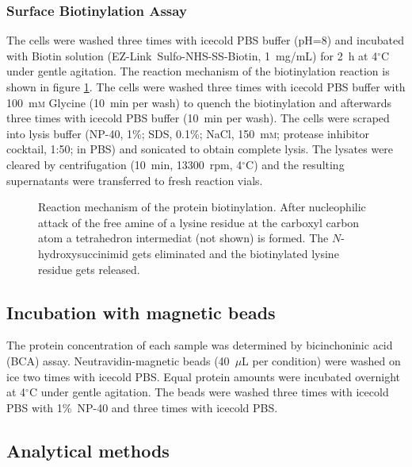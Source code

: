 \documentclass[a4paper,11pt,bibtotocnumbered]{article}
\begin{document}
\subsubsection{Surface Biotinylation Assay}


The cells were washed three times with icecold PBS buffer (pH=8) and incubated with Biotin solution (EZ-Link\texttrademark \ Sulfo-NHS-SS-Biotin, 1~mg/mL) for 2~h at 4$^\circ$C under gentle agitation. The reaction mechanism of the biotinylation reaction is shown in figure \ref{Biotinylation}. The cells were washed three times with icecold PBS buffer with 100~m\textsc{m} Glycine (10~min per wash) to quench the biotinylation and afterwards three times with icecold PBS buffer (10~min per wash). The cells were scraped into lysis buffer (NP-40, 1\%; SDS, 0.1\%; NaCl, 150~m\textsc{m}; protease inhibitor cocktail, 1:50; in PBS) and sonicated to obtain complete lysis. The lysates were cleared by centrifugation (10~min, 13300~rpm, 4$^\circ$C) and the resulting supernatants were transferred to fresh reaction vials.


\begin{figure}[H]
\centering
{\captionsetup{format=hang}\caption[Reaction mechanism of the protein biotinylation.]{Reaction mechanism of the protein biotinylation. After nucleophilic attack of the free amine of a lysine residue at the carboxyl carbon atom a tetrahedron intermediat (not shown) is formed. The $N$-hydroxysuccinimid gets eliminated and the biotinylated lysine residue gets released.}\label{Biotinylation}}
\end{figure}

\subsection{Incubation with magnetic beads}


The protein concentration of each sample was determined by bicinchoninic acid (BCA) assay. Neutravidin-magnetic beads (40~$\mu$L per condition) were washed on ice two times with icecold PBS. Equal protein amounts were incubated overnight at 4$^\circ$C under gentle agitation. 
The beads were washed three times with icecold PBS with 1\%~NP-40 and three times with icecold PBS.



\newpage
\subsection{Analytical methods}
\end{document}

